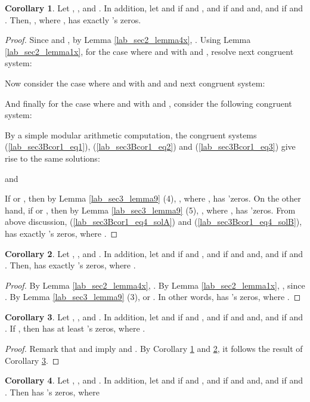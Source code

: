 \documentclass{mcom-l}
\theoremstyle{definition}
\newtheorem{sec3Bcor1}{Corollary}[section]
\newtheorem{sec3Bcor2}[sec3Bcor1]{Corollary}
\newtheorem{sec3Bcor3}[sec3Bcor1]{Corollary}
\newtheorem{sec3Bcor4}[sec3Bcor1]{Corollary}
\numberwithin{equation}{section}
\begin{document}
   \begin{sec3Bcor1}\label{lab_sec3Bcor1}
   Let , ,  and . In addition, let  and  if  and ,  and  if  and  and,  and  if  and . Then, , where  , has exactly 's zeros.
   \end{sec3Bcor1}
   \begin{proof}
   Since  and , by Lemma \ref{lab_sec2_lemma4x}, . Using Lemma \ref{lab_sec2_lemma1x}, for the case where  and  with  and , resolve next congruent system:
   
    Now consider the case where  and  with  and  and next congruent system:  
    
   And finally for the case where  and  with  and , consider the following  congruent system: 
    
    By a simple modular arithmetic computation, the congruent systems (\ref{lab_sec3Bcor1_eq1}), (\ref{lab_sec3Bcor1_eq2}) and (\ref{lab_sec3Bcor1_eq3}) give rise to the same solutions:
    
    and
    
    If  or , then by Lemma \ref{lab_sec3_lemma9} (4), , where , has 'zeros. On the other hand, if  or , then by Lemma \ref{lab_sec3_lemma9} (5), , where , has 'zeros. From above discussion, (\ref{lab_sec3Bcor1_eq4_solA}) and (\ref{lab_sec3Bcor1_eq4_solB}),  has exactly 's zeros, where .
   \end{proof}
    \begin{sec3Bcor2}\label{lab_sec3Bcor2}
    Let , ,  and . In addition, let  and  if  and ,  and  if  and  and,  and  if  and . Then,  has exactly 's zeros, where .
    \end{sec3Bcor2}
   \begin{proof}
   By Lemma \ref{lab_sec2_lemma4x}, . By Lemma \ref{lab_sec2_lemma1x}, , since . By Lemma \ref{lab_sec3_lemma9} (3),  or . In other words,   has  's zeros, where .
   \end{proof}
    \begin{sec3Bcor3}\label{lab_sec3Bcor3}
    Let , ,  and . In addition, let  and  if  and ,  and  if  and  and,  and  if  and . If , then  has at least 's zeros, where .
    \end{sec3Bcor3}
    \begin{proof}
    Remark that  and  imply  and . By Corollary \ref{lab_sec3Bcor1} and \ref{lab_sec3Bcor2}, it follows the result of Corollary \ref{lab_sec3Bcor3}.
    \end{proof}
    \begin{sec3Bcor4}\label{lab_sec3Bcor4}
      Let , ,  and . In addition, let  and  if  and ,  and  if  and  and,  and  if  and .  Then  has  's zeros, where 
      \end{sec3Bcor4}
\end{document}
